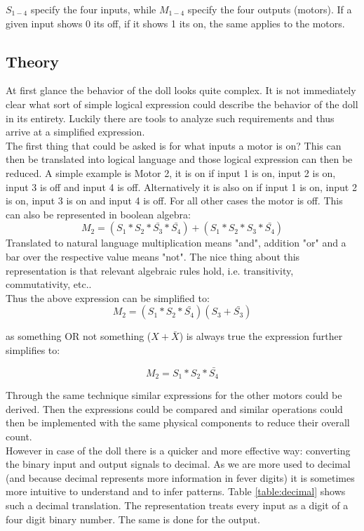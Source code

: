 \documentclass[14pt]{article}
\begin{document}
$S_{1-4}$ specify the four inputs, while $M_{1-4}$ specify the four outputs (motors). If a given input shows 0 its off, if it shows 1 its on, the same applies
to the motors.

\subsection{Theory}
At first glance the behavior of the doll looks quite complex. It is not immediately clear what sort of simple logical expression could describe
the behavior of the doll in its entirety. Luckily there are tools to analyze such requirements and thus arrive at a simplified expression.\\

The first thing that could be asked is for what inputs a motor is on? This can then be translated into logical language
and those logical expression can then be reduced. A simple example is Motor 2, it is on if input 1 is on, input 2 is on, input 3 is off and input 4 is off.
Alternatively it is also on if input 1 is on, input 2 is on, input 3 is on and input 4 is off. For all other cases the motor is off. This can also
be represented in boolean algebra:
$$
M_2 = (S_1*S_2*\bar{S_3}*\bar{S_4}) + (S_1*S_2*S_3*\bar{S_4})
$$
Translated to natural language multiplication means "and", addition "or" and a bar over the respective value means "not". The nice thing about this
representation is that relevant algebraic rules hold, i.e. transitivity, commutativity, etc.\autocite{ross}.\\

Thus the above expression can be simplified to:
$$
M_2 = (S_1*S_2*\bar{S_4})(S_3+\bar{S_3})
$$

as something OR not something ($ X + \bar{X} $) is always true the expression further simplifies to:

$$
M_2 = S_1*S_2*\bar{S_4}
$$

Through the same technique similar expressions for the other motors could be derived. Then the expressions could be compared and
similar operations could then be implemented with the same physical components to reduce their overall count.\\

However in case of the doll there is a quicker and more effective way: converting the binary input and output signals to decimal. 
As we are more used to decimal (and because decimal represents more information in fever digits) it is sometimes more intuitive to understand 
and to infer patterns. Table \ref{table:decimal} shows such a decimal translation. The representation
treats every input as a digit of a four digit binary number. The same is done for the output.
\end{document}
